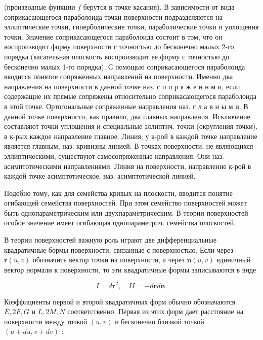 \documentclass[10pt]{article}
\begin{document}
(производные функции $f$ берутся в точке касания). В зависимости от вида соприкасающегося параболоида точки поверхности подразделяются на эллиптические точки, гиперболические точки, параболические точки и уплощения точки. Значение соприкасающегося параболоида состоит в том, что он воспроизводит форму поверхности с точностью до бесконечно малых 2-го порядка (касательная плоскость воспроизводит ее форму с точностью до бесконечно малых 1-го порядка). С помощью соприкасающегося параболоида вводится понятие сопряженных направлений на поверхности. Именно два направления на поверхности в данной точке наз. с о п р я ж е н н м и, если содержащие их прямые сопряжены относительно соприкасающегося параболоида в этой точке. Ортогональные сопряженные направления наз. г л а в н ы м и. В данной точке поверхности, как правило, два главных направления. Исключение составляют точки уплощения и специальные эллиптич. точки (округления точки), в к-рых каждое направление главное. Линия, у к-рой в каждой точке направление является главным, наз. кривизны линией. В точках поверхности, не являющихся эллиптическими, существуют самосопряженные направления. Они наз. асимптотическими направлениями. ЈІиния на поверхности, направление к-рой в каждой точке асимптотическое, наз. асимптотической линией.



Подобно тому, как для семейства кривых на плоскости, вводится понятие огибающей семейства поверхностей. При этом семейство поверхностей может быть однопараметрическим или двухпараметрическим. В теории поверхностей особое значение имеет огибающая однопараметрич. семейства плоскостей.



В теории поверхностей важную роль играют две дифференциальные квадратичные бормы поверхности, связанные с поверхностью. Если через $\boldsymbol{r}(u, v)$ обозначить вектор точки на поверхности, а через $\boldsymbol{n}(u, v)$ единичный вектор нормали к поверхности, то эти квадратичные формы записываются в виде



\[

I=d \boldsymbol{r}^{2}, \quad I I=-d \boldsymbol{r} d \boldsymbol{n} .

\]



Коэффициенты первой и второй квадратичных форм обычно обозначаются $E, 2 F, G$ и $L, 2 M, N$ соответственно. Первая из этих форм дает расстояние на поверхности между точкой $(u, v)$ и бесконечно близкой точкой $(u+d u, v+d v)$ :
\end{document}
